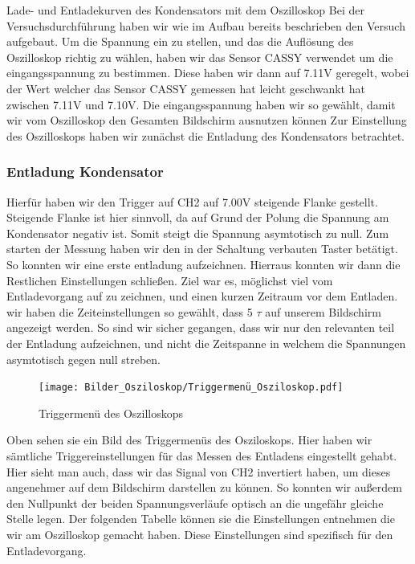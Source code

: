 \documentclass[twoside]{protokoll}
\begin{document}
\begin{aufgabe}{Lade- und Entladekurven des Kondensators mit dem Oszilloskop}
  Bei der Versuchsdurchführung haben wir wie im Aufbau bereits beschrieben den Versuch 
  aufgebaut. Um die Spannung ein zu stellen, und das die Auflösung des Oszilloskop richtig zu
  wählen, haben wir das Sensor CASSY verwendet um die eingangsspannung zu bestimmen. Diese haben
  wir dann auf 7.11V geregelt, wobei der Wert welcher das Sensor CASSY gemessen hat leicht 
  geschwankt hat zwischen 7.11V und 7.10V. Die eingangsspannung haben wir so gewählt, 
  damit wir vom Oszilloskop den Gesamten Bildschirm ausnutzen können Zur Einstellung des     Oszilloskops haben wir zunächst die Entladung des Kondensators betrachtet. 
  
  \subsubsection{Entladung Kondensator}
  
  Hierfür haben wir den Trigger auf CH2 auf 7.00V 
   steigende Flanke gestellt. Steigende Flanke ist hier sinnvoll, da auf Grund der Polung 
  die Spannung am Kondensator negativ ist. Somit steigt die Spannung asymtotisch zu null. 
  Zum starten der Messung haben wir den in der Schaltung verbauten Taster betätigt.
  So konnten wir eine erste entladung aufzeichnen. Hierraus konnten wir dann die Restlichen 
  Einstellungen schließen. Ziel war es, möglichst viel vom Entladevorgang auf zu zeichnen, und 
  einen kurzen Zeitraum vor dem Entladen.
  wir haben die Zeiteinstellungen so gewählt, dass 5 $\tau$ auf unserem Bildschirm angezeigt
  werden. So sind wir sicher gegangen, dass wir nur den relevanten teil der Entladung aufzeichnen, 
  und nicht die Zeitspanne in welchem die Spannungen asymtotisch gegen null streben. 

\begin{figure}[H]
  \centering
    \texttt{[image: Bilder\_Osziloskop/Triggermenü\_Osziloskop.pdf]}
  \caption{Triggermenü des Oszilloskops}
  \centering
\end{figure}

Oben sehen sie ein Bild des Triggermenüs des Osziloskops. Hier haben wir sämtliche Triggereinstellungen für das Messen des Entladens eingestellt gehabt. 
Hier sieht man auch, dass wir das Signal von CH2 invertiert haben, um dieses angenehmer
auf dem Bildschirm darstellen zu können. So konnten wir außerdem den Nullpunkt der beiden 
Spannungsverläufe optisch an die ungefähr gleiche Stelle legen. Der folgenden Tabelle
können sie die Einstellungen entnehmen die wir am Oszilloskop gemacht haben.
Diese Einstellungen sind spezifisch für den Entladevorgang.



\end{aufgabe}
\end{document}
